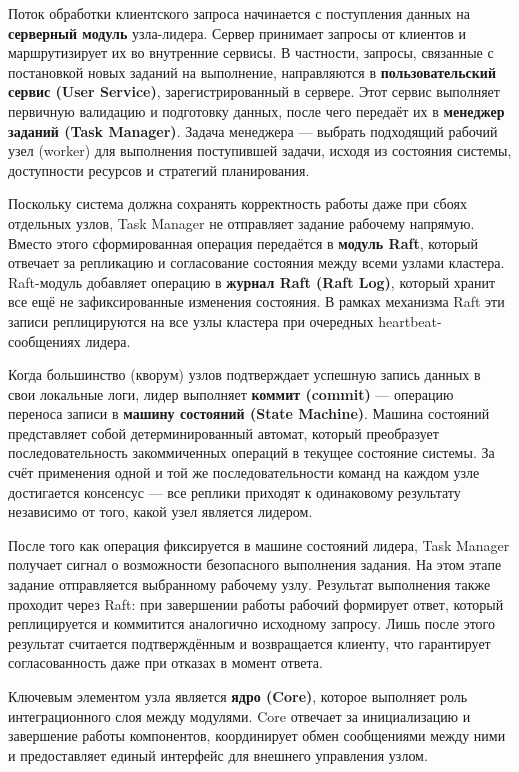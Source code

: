 Поток обработки клиентского запроса начинается с поступления данных на
\textbf{серверный модуль} узла-лидера. Сервер принимает запросы от клиентов и
маршрутизирует их во внутренние сервисы. В частности, запросы, связанные с
постановкой новых заданий на выполнение, направляются в
\textbf{пользовательский сервис (User Service)}, зарегистрированный в сервере.
Этот сервис выполняет первичную валидацию и подготовку данных, после чего
передаёт их в \textbf{менеджер заданий (Task Manager)}. Задача менеджера —
выбрать подходящий рабочий узел (worker) для выполнения поступившей задачи,
исходя из состояния системы, доступности ресурсов и стратегий планирования.

Поскольку система должна сохранять корректность работы даже при сбоях
отдельных узлов, Task Manager не отправляет задание рабочему напрямую.
Вместо этого сформированная операция передаётся в
\textbf{модуль Raft}, который отвечает за репликацию и согласование
состояния между всеми узлами кластера. Raft-модуль добавляет операцию
в \textbf{журнал Raft (Raft Log)}, который хранит все ещё не
зафиксированные изменения состояния. В рамках механизма Raft эти записи
реплицируются на все узлы кластера при очередных heartbeat-сообщениях
лидера.

Когда большинство (кворум) узлов подтверждает успешную запись данных в свои
локальные логи, лидер выполняет \textbf{коммит (commit)} — операцию переноса
записи в \textbf{машину состояний (State Machine)}. Машина состояний
представляет собой детерминированный автомат, который преобразует
последовательность закоммиченных операций в текущее состояние системы. За счёт
применения одной и той же последовательности команд на каждом узле достигается
консенсус — все реплики приходят к одинаковому результату независимо от того,
какой узел является лидером.

После того как операция фиксируется в машине состояний лидера, Task Manager
получает сигнал о возможности безопасного выполнения задания. На этом этапе
задание отправляется выбранному рабочему узлу. Результат выполнения также проходит
через Raft: при завершении работы рабочий формирует ответ, который реплицируется
и коммитится аналогично исходному запросу. Лишь после этого результат считается
подтверждённым и возвращается клиенту, что гарантирует согласованность даже при
отказах в момент ответа.

Ключевым элементом узла является \textbf{ядро (Core)}, которое выполняет роль
интеграционного слоя между модулями. Core отвечает за инициализацию и
завершение работы компонентов, координирует обмен сообщениями между ними и
предоставляет единый интерфейс для внешнего управления узлом.

